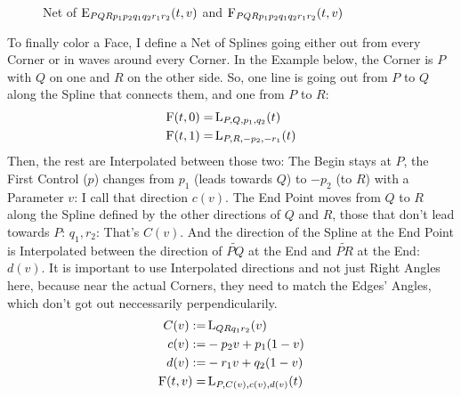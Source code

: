 \begin{figure}
		\caption{Net of $\operatorname{E}_{PQRp_1p_2q_1q_2r_1r_2}(t, v)$ and $\operatorname{F}_{PQRp_1p_2q_1q_2r_1r_2}(t, v)$}
		\label{fig:eta}
	\end{figure}
	To finally color a Face, I define a Net of Splines going either out from every Corner or in waves around every Corner. In the Example below, the Corner is $P$ with $Q$ on one and $R$ on the other side. So, one line is going out from $P$ to $Q$ along the Spline that connects them, and one from $P$ to $R$:
	$$\begin{aligned}
		\operatorname{F}(t, 0) =& \operatorname{L}_{P,Q,p_1,q_2}(t) \\
		\operatorname{F}(t, 1) =& \operatorname{L}_{P,R,-p_2,-r_1}(t) \\
	\end{aligned}$$
	Then, the rest are Interpolated between those two: The Begin stays at $P$, the First Control ($p$) changes from $p_1$ (leads towards $Q$) to $-p_2$ (to $R$) with a Parameter $v$: I call that direction $c(v)$. The End Point moves from $Q$ to $R$ along the Spline defined by the other directions of $Q$ and $R$, those that don't lead towards $P$: $q_1, r_2$: That's $C(v)$. And the direction of the Spline at the End Point is Interpolated between the direction of $\widetilde{PQ}$ at the End and $\widetilde{PR}$ at the End: $d(v)$. It is important to use Interpolated directions and not just Right Angles here, because near the actual Corners, they need to match the Edges' Angles, which don't got out neccessarily perpendicularily.
	$$\begin{aligned}
		C(v) :=& \operatorname{L}_{QRq_1r_2}(v) \\
		c(v) :=& -p_2v + p_1(1-v) \\
		d(v) :=& -r_1v + q_2(1-v) \\
		\operatorname{F}(t, v) =& \operatorname{L}_{P,C(v),c(v),d(v)}(t) \\
	\end{aligned}$$
